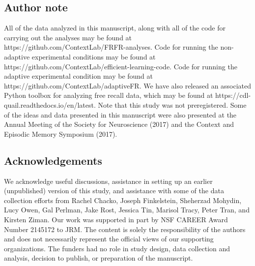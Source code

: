 \documentclass[11pt]{article}
\begin{document}
\subsection*{Author note}

All of the data analyzed in this manuscript, along with all of the code for
carrying out the analyses may be found at
https://github.com/ContextLab/FRFR-analyses. Code for running the non-adaptive
experimental conditions may be found at
https://github.com/Con\-text\-Lab/efficient-learning-code. Code for running the
adaptive experimental condition may be found at
https://github.com/ContextLab/adaptiveFR. We have also released an associated
Python toolbox for analyzing free recall data, which may be found at
https://cdl-quail.read\-the\-docs.io/\-en/\-latest.  Note that this study was not
preregistered.  Some of the ideas and data presented in this manuscript
were also presented at the Annual Meeting of the Society for Neuroscience (2017)
and the Context and Episodic Memory Symposium (2017).

\subsection*{Acknowledgements}

We acknowledge useful discussions, assistance in setting up an earlier
(unpublished) version of this study, and assistance with some of the data
collection efforts from Rachel Chacko, Joseph Finkelstein, Sheherzad Mohydin,
Lucy Owen, Gal Perlman, Jake Rost, Jessica Tin, Marisol Tracy,
Peter Tran, and Kirsten Ziman. Our work was supported in part by NSF CAREER Award Number
2145172 to JRM. The content is solely the responsibility of the authors and
does not necessarily represent the official views of our supporting
organizations. The funders had no role in study design, data collection and
analysis, decision to publish, or preparation of the manuscript.



\end{document}
